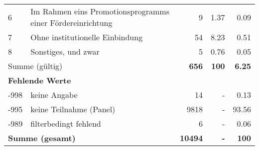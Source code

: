 \begin{longtable}{lXrrr}
     6 &
     \multicolumn{1}{X}{ Im Rahmen eins Promotionsprogramms einer Fördereinrichtung   } &


       \num{9} &
       \num[round-mode=places,round-precision=2]{1,37} &
         \num[round-mode=places,round-precision=2]{0,09} \\

     7 &
     \multicolumn{1}{X}{ Ohne institutionelle Einbindung   } &


       \num{54} &
       \num[round-mode=places,round-precision=2]{8,23} &
         \num[round-mode=places,round-precision=2]{0,51} \\

     8 &
     \multicolumn{1}{X}{ Sonstiges, und zwar   } &


       \num{5} &
       \num[round-mode=places,round-precision=2]{0,76} &
         \num[round-mode=places,round-precision=2]{0,05} \\
     \midrule
     \multicolumn{2}{l}{Summe (gültig)} &
       \textbf{\num{656}} &
     \textbf{100} &
       \textbf{\num[round-mode=places,round-precision=2]{6,25}} \\
     \multicolumn{5}{l}{\textbf{Fehlende Werte}}\\
       -998 &
       keine Angabe &
         \num{14} &
        - &
         \num[round-mode=places,round-precision=2]{0,13} \\
       -995 &
       keine Teilnahme (Panel) &
         \num{9818} &
        - &
         \num[round-mode=places,round-precision=2]{93,56} \\
       -989 &
       filterbedingt fehlend &
         \num{6} &
        - &
         \num[round-mode=places,round-precision=2]{0,06} \\
     \midrule
     \multicolumn{2}{l}{\textbf{Summe (gesamt)}} &
          \textbf{\num{10494}} &
        \textbf{-} &
        \textbf{100} \\
     \bottomrule
     \end{longtable}
     

